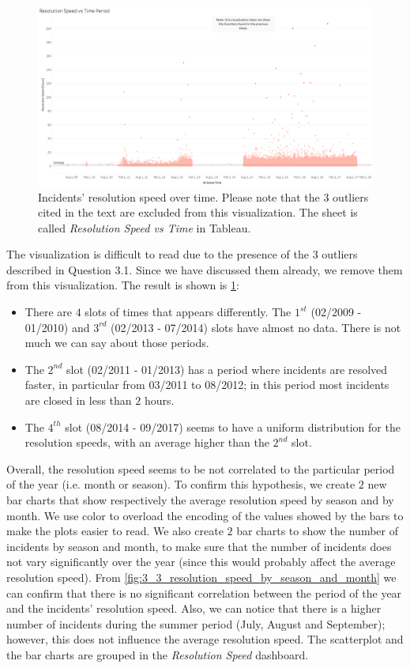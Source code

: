 \begin{figure}[h]
	\centering
	\includegraphics[width=\columnwidth]{figures/3_3_resolution_speed_vs_time}
	\caption{Incidents' resolution speed over time. Please note that the $3$ outliers cited in the text are excluded from this visualization. The sheet is called \textit{Resolution Speed vs Time} in Tableau.}
	\label{fig:3_3_resolution_speed_vs_time}
\end{figure}

The visualization is difficult to read due to the presence of the $3$ outliers described in Question 3.1.
Since we have discussed them already, we remove them from this visualization.
The result is shown is \cref{fig:3_3_resolution_speed_vs_time}:
\begin{itemize}
    \item There are $4$ slots of times that appears differently. The $1^{st}$ (02/2009 - 01/2010) and $3^{rd}$ (02/2013 - 07/2014) slots have almost no data. There is not much we can say about those periods.
    \item The $2^{nd}$ slot (02/2011 - 01/2013) has a period where incidents are resolved faster, in particular from 03/2011 to 08/2012; in this period most incidents are closed in less than $2$ hours.
    \item The $4^{th}$ slot (08/2014 - 09/2017) seems to have a uniform distribution for the resolution speeds, with an average higher than the $2^{nd}$ slot.
\end{itemize}

Overall, the resolution speed seems to be not correlated to the particular period of the year (i.e. month or season).
To confirm this hypothesis, we create $2$ new bar charts that show respectively the average resolution speed by season and by month.
We use color to overload the encoding of the values showed by the bars to make the plots easier to read.
We also create $2$ bar charts to show the number of incidents by season and month, to make sure that the number of incidents does not vary significantly over the year (since this would probably affect the average resolution speed).
From \cref{fig:3_3_resolution_speed_by_season_and_month} we can confirm that there is no significant correlation between the period of the year and the incidents' resolution speed.
Also, we can notice that there is a higher number of incidents during the summer period (July, August and September);
however, this does not influence the average resolution speed.
The scatterplot and the bar charts are grouped in the \textit{Resolution Speed} dashboard.

